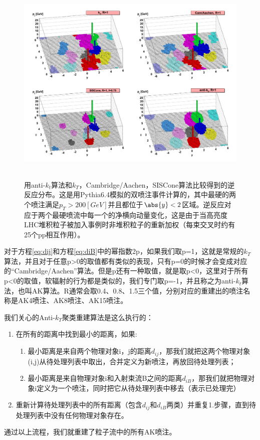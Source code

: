 \begin{figure}[H]
 \centering
 \includegraphics[height=10cm, width=13cm]{pictures/anti-kt-3D.png}
 \caption{用anti-$k_t$算法和$k_T$，Cambridge/Aachen，SISCone算法比较得到的逆反应分布。这是用Pythia6.4模拟的双喷注事件计算的，其中最硬的两个喷注满足$p_T>200[GeV]$并且都位于$\abs{y}<2$区域。逆反应对应于两个最硬喷流中每一个的净横向动量变化，这是由于当高亮度LHC堆积粒子被加入事例时非堆积粒子的重新加权（每束交叉时约有25个pp相互作用）。\cite{The_anti-kt_jet_clustering_algorithm}}
 \label{fig:3.5}
\end{figure}

对于方程\eqref{eq:dij}和方程\eqref{eq:diB}中的幂指数2p，如果我们取p=1，这就是常规的$k_T$算法，并且对于任意p>0的取值都有类似的表现，只有p=0的时候才会变成对应的“Cambridge/Aachen”算法。但是p还有一种取值，就是取p<0，这里对于所有p<0的取值，软辐射的行为都是类似的，我们专门取p=-1，并且称之为anti-$k_t$算法，也叫AK算法。R通常会取0.4、0.8、1.5三个值，分别对应的重建出的喷注名称是AK4喷注、AK8喷注、AK15喷注。

我们关心的Anti-$k_T$聚类重建算法是这么执行的：
\begin{enumerate}
    \item 在所有的距离中找到最小的距离，如果:
    \begin{enumerate}[(1)]
        \item 最小距离是来自两个物理对象i，j的距离$d_{ij}$，那我们就把这两个物理对象(i,j)从待处理列表中取出，合并定义为新喷注，再放回待处理列表；
        \item 最小距离是来自物理对象i和入射束流B之间的距离$d_{iB}$，那我们就把物理对象i定义为一个喷注，同时把它从待处理列表中移去（表示已处理完）
    \end{enumerate}
    \item 重新计算待处理列表中的所有距离（包含$d_{ij}$和$d_{iB}$两类）并重复1.步骤，直到待处理列表中没有任何物理对象存在。
\end{enumerate}
通过以上流程，我们就重建了粒子流中的所有AK喷注。



